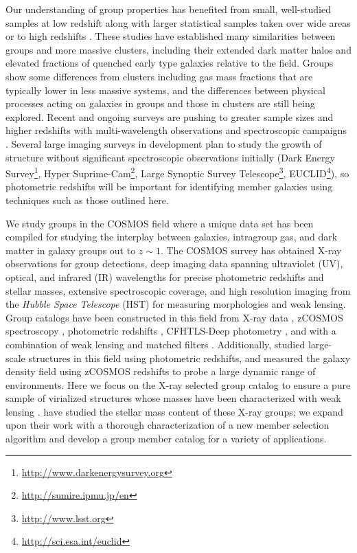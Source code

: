 Our understanding of group properties has benefited from small,
well-studied samples at low redshift \citep[e.g.,][]{Mulchaey1998, Zabludoff1998,
  Tran2001, Sun2009} along with larger statistical samples taken over wide
areas or to high redshifts \citep[e.g.,][]{Eke2004, Gerke2005,
  Gladders2005, Miller2005, Yang2005, Berlind2006,
  Hansen2009}. These studies have established many similarities
between groups and more massive clusters, including their extended
dark matter halos and elevated fractions of quenched early type
galaxies relative to the field. Groups show some differences from
clusters including gas mass fractions that are typically lower in less
massive systems, and the differences between physical processes acting on
galaxies in groups and those in clusters are still being explored.
Recent and ongoing surveys are pushing to greater 
sample sizes and higher redshifts with multi-wavelength observations and
spectroscopic campaigns \citep[e.g.,][]{Osmond2004, Driver2009,
  Milkeraitis2010, Adami2010}. Several large imaging surveys in
development plan to study the growth of structure without significant
spectroscopic observations initially (Dark Energy
Survey\footnote{\url{http://www.darkenergysurvey.org}}, Hyper
Suprime-Cam\footnote{\url{http://sumire.ipmu.jp/en}}, Large Synoptic
Survey Telescope\footnote{\url{http://www.lsst.org}},
EUCLID\footnote{\url{http://sci.esa.int/euclid}}), so photometric
redshifts will be important for identifying member galaxies using
techniques such as those outlined here.

We study groups in the COSMOS field where a unique data set has been compiled for studying the
interplay between galaxies, intragroup gas, and dark matter in galaxy
groups out to $z\sim1$. The COSMOS survey has obtained X-ray observations for group detections, deep
imaging data spanning ultraviolet (UV), optical, and infrared (IR)
wavelengths for precise photometric redshifts and stellar masses,
extensive spectroscopic coverage, and high resolution imaging from the {\sl
  Hubble Space Telescope} (HST) for measuring morphologies and weak
lensing. Group catalogs have been  
constructed in this field from X-ray data \citep[][and in prep.]{Finoguenov2007},
zCOSMOS spectroscopy \citep{Knobel2009}, photometric redshifts
\citep{Gillis2011}, CFHTLS-Deep photometry
\citep{Olsen2007,Grove2009}, and with a combination of weak lensing
and matched filters \citep{Bellagamba2011}. Additionally,
\citet{Scoville2007b} studied large-scale structures in this field
using photometric redshifts, and \citet{Kovac2010a} measured the
galaxy density field using zCOSMOS redshifts to probe a large dynamic
range of environments. Here we focus on the X-ray selected group
catalog to ensure a pure sample of virialized structures whose masses
have been characterized with weak lensing \citep{Leauthaud2010}.
\citet{Giodini2009} have studied the stellar
mass content of these X-ray groups; we expand upon their work with a
thorough characterization of a new member selection algorithm and
develop a group member catalog for a variety of applications.

